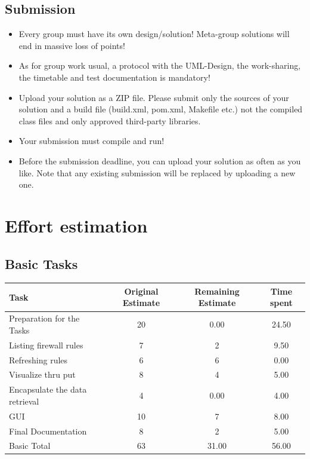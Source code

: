 \documentclass[11pt, a4paper]{article}
\begin{document}
\subsection{Submission}
\begin{itemize}
\item Every group must have its own design/solution! Meta-group solutions will end in massive loss of points!
\item As for group work usual, a protocol with the UML-Design, the work-sharing, the timetable and test documentation is mandatory!
\item Upload your solution as a ZIP file. Please submit only the sources of your solution and a build file (build.xml, pom.xml, Makefile etc.) not the compiled class files and only approved third-party libraries. \item Your submission must compile and run!
\item Before the submission deadline, you can upload your solution as often as you like. Note that any existing submission will be replaced by uploading a new one.
\end{itemize}

\newpage

\section{Effort estimation}
\subsection{Basic Tasks}
\begin{tabular} {| l | c | c | c |} \hline
Task &	Original Estimate & Remaining Estimate & Time spent \\ \hline
Preparation for the Tasks &	20 &	0.00 & 24.50 \\ \hline
Listing firewall rules &	7 &	2 &	9.50 \\ \hline
Refreshing rules &	6 &	6 &	0.00 \\ \hline
Visualize thru put & 8 &	4 &	5.00 \\ \hline
Encapsulate the data retrieval &	4	& 0.00 &	4.00 \\ \hline
GUI	 & 10 &	7 &	8.00 \\ \hline
Final Documentation  &	8	& 2	& 5.00 \\ \hline
Basic Total	& 63 &	31.00 &	56.00 \\ \hline
\end{tabular}
\end{document}
